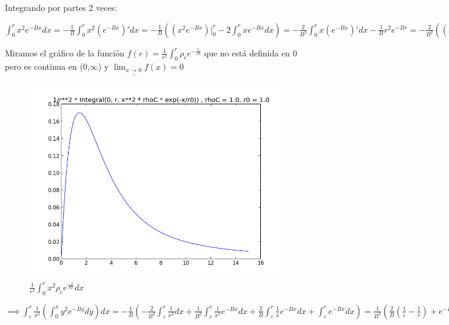 \documentclass[12pt]{book}
\begin{document}
\begin{description}
\item Integrando por partes 2 veces:
\item $\int_0^r{x^2 e^{-Bx}dx} = - \frac{1}{B} \int_0^r{x^2 (e^{-Bx})\prime dx}
=-\frac{1}{B}( (x^2 e^{-Bx})\Big|_0^r  - 2\int_0^r{x e^{-Bx}dx})  = -\frac{2}{B^2}\int_0^r{x (e^{-Bx})\prime dx} - \frac{1}{B}r^2 e^{-Br} = -\frac{2}{B^2}((x e^{-Bx})\Big|_0^r - \int_0^r{e^{-Bx}dx}) - \frac{1}{B}r^2 e^{-Br} = -\frac{2}{B^3}e^{-Bx}\Big|_0^r -\frac{2}{B^2}r e^{-Br} - \frac{1}{B}r^2 e^{-Br} = \frac{2}{B^3} -\frac{2}{B^3}e^{-Br} -\frac{2}{B^2}r e^{-Br} - \frac{1}{B}r^2 e^{-Br}  $
\item Miramos el gráfico de la función $f(r) = \frac{1}{r^2}  \int_0^r{\rho_c  e^{-\frac{r}{r0}}}$
que no está definida en 0 pero es continua en (0,$\infty$) y $  \lim_{x \underset{>}{\to} 0} f(x) = 0$
\begin{figure}[!ht]
 \centering
 \includegraphics[scale=0.33]{func2Plot.png}
 \caption{\emph{$\frac{1}{r^2}\int_0^r{x^2  \rho_c  e^{\frac{-x}{r0}}dx}   $}}
\end{figure}



\item $\implies \int_\varepsilon^r{ \frac{1}{x^2}(\int_0^x{y^2 e^{-By}dy})dx} = 
-\frac{1}{B}(-\frac{2}{B^2}\int_\varepsilon^r{\frac{1}{x^2}dx} +\frac{1}{B^2}\int_\varepsilon^r{\frac{1}{x^2}e^{-Bx}dx}  + \frac{2}{B}\int_\varepsilon^r{\frac{1}{x} e^{-Bx}dx} + \int_\varepsilon^r{e^{-Bx}dx} ) = 
\frac{1}{B^2}(\frac{2}{B}(\frac{1}{\varepsilon} - \frac{1}{r})  + e^{-Br} - \frac{1}{B}\int_\varepsilon^r{\frac{1}{x^2}e^{-Bx}dx} - 2\int_\varepsilon^r{\frac{1}{x} e^{-Bx}dx} ) $


\end{description}
\end{document}
